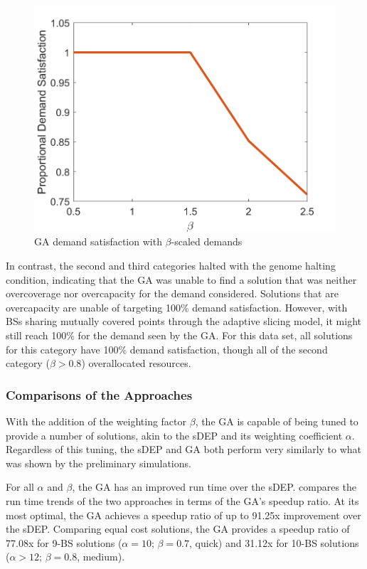 \documentclass[12pt,dvipsnames]{report}
\begin{document}
\begin{figure}[htp]
	\centering
	\includegraphics[height=0.4\textheight]{Figures/CaseI_GAScaledSatisfaction}
	\caption[Case I GA demand satisfaction with $\beta$-scaled demands]{GA demand satisfaction with $\beta$-scaled demands}
	\label{fig:CaseI_GAScaledSatisfaction}
\end{figure}

In contrast, the second and third categories halted with the genome halting condition, indicating that the GA was unable to find a solution that was neither overcoverage nor overcapacity for the demand considered.  Solutions that are overcapacity are unable of targeting 100\% demand satisfaction.  However, with BSs sharing mutually covered points through the adaptive slicing model, it might still reach 100\% for the demand seen by the GA.  For this data set, all solutions for this category have 100\% demand satisfaction, though all of the second category ($\beta > 0.8$) overallocated resources.

\subsubsection{Comparisons of the Approaches}

With the addition of the weighting factor $\beta$, the GA is capable of being tuned to provide a number of solutions, akin to the sDEP and its weighting coefficient $\alpha$.  Regardless of this tuning, the sDEP and GA both perform very similarly to what was shown by the preliminary simulations.

For all $\alpha$ and $\beta$, the GA has an improved run time over the sDEP.   compares the run time trends of the two approaches in terms of the GA's speedup ratio.  At its most optimal, the GA achieves a speedup ratio of up to 91.25x improvement over the sDEP.  Comparing equal cost solutions, the GA provides a speedup ratio of 77.08x for 9-BS solutions ($\alpha = 10;\, \beta = 0.7$, quick) and 31.12x for 10-BS solutions ($\alpha > 12;\, \beta = 0.8$, medium).
\end{document}
